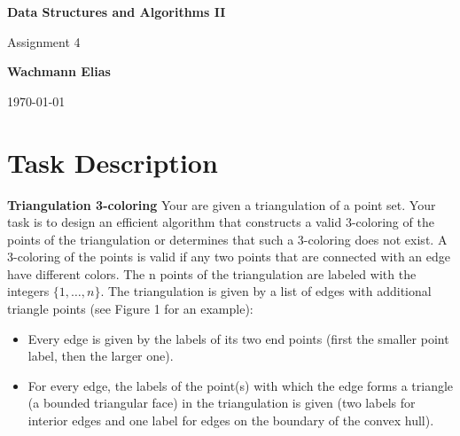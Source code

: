 \documentclass[english]{scrartcl}
\begin{document}
\begin{titlepage}
    \begin{center}
        \vspace{1cm}
        \Huge
        \textbf{Data Structures and Algorithms II}
        \vspace{5mm}

        \Large
        Assignment 4
        \vspace{5mm}


        \textbf{Wachmann Elias}


        \today
    \end{center}
\end{titlepage}

\clearpage
\newpage

\section{Task Description}
\label{sec:problem}
\textbf{Triangulation 3-coloring} 
\newline
Your are given a triangulation of a point set. Your task is to design an efficient algorithm that constructs a valid 3-coloring of the points of the triangulation or determines that such a 3-coloring does not exist. A 3-coloring of the points is valid if any two points that are connected with an edge have different colors.
The n points of the triangulation are labeled with the integers $\{1, \dots, n\}$. The triangulation is given by a list of edges with additional triangle points (see Figure 1 for an example):
\begin{itemize}
    \item Every edge is given by the labels of its two end points (first the smaller point label, then the larger one).
    \item For every edge, the labels of the point(s) with which the edge forms a triangle (a bounded triangular face) in the triangulation is given (two labels for interior edges and one label for edges on the boundary of the convex hull).
\end{itemize}
\end{document}
